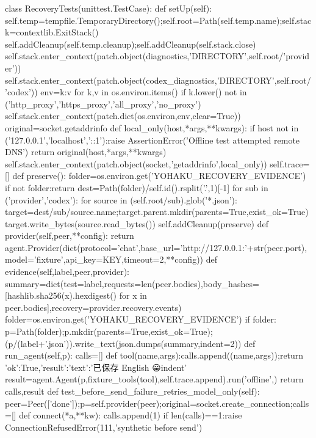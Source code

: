 {class RecoveryTests(unittest.TestCase):
    def setUp(self):
        self.temp=tempfile.TemporaryDirectory();self.root=Path(self.temp.name);self.stack=contextlib.ExitStack()
        self.addCleanup(self.temp.cleanup);self.addCleanup(self.stack.close)
        self.stack.enter_context(patch.object(diagnostics,'DIRECTORY',self.root/'provider'))
        self.stack.enter_context(patch.object(codex_diagnostics,'DIRECTORY',self.root/'codex'))
        env={k:v for k,v in os.environ.items() if k.lower() not in ('http_proxy','https_proxy','all_proxy','no_proxy')}
        self.stack.enter_context(patch.dict(os.environ,env,clear=True))
        original=socket.getaddrinfo
        def local_only(host,*args,**kwargs):
            if host not in ('127.0.0.1','localhost','::1'):raise AssertionError('Offline test attempted remote DNS')
            return original(host,*args,**kwargs)
        self.stack.enter_context(patch.object(socket,'getaddrinfo',local_only))
        self.trace=[]
        def preserve():
            folder=os.environ.get('YOHAKU_RECOVERY_EVIDENCE')
            if not folder:return
            dest=Path(folder)/self.id().rsplit('.',1)[-1]
            for sub in ('provider','codex'):
                for source in (self.root/sub).glob('*.json'):
                    target=dest/sub/source.name;target.parent.mkdir(parents=True,exist_ok=True)
                    target.write_bytes(source.read_bytes())
        self.addCleanup(preserve)
    def provider(self,peer,**config):
        return agent.Provider(dict(protocol='chat',base_url='http://127.0.0.1:'+str(peer.port),model='fixture',api_key=KEY,timeout=2,**config))
    def evidence(self,label,peer,provider):
        summary=dict(test=label,requests=len(peer.bodies),body_hashes=[hashlib.sha256(x).hexdigest() for x in peer.bodies],recovery=provider.recovery.events)
        folder=os.environ.get('YOHAKU_RECOVERY_EVIDENCE')
        if folder:
            p=Path(folder);p.mkdir(parents=True,exist_ok=True);(p/(label+'.json')).write_text(json.dumps(summary,indent=2))
    def run_agent(self,p):
        calls=[]
        def tool(name,args):calls.append((name,args));return {'ok':True,'result':{'text':'已保存 English 😀\n  indent'}}
        result=agent.Agent(p,fixture_tools(tool),self.trace.append).run('offline',{})
        return calls,result
    def test_before_send_failure_retries_model_only(self):
        peer=Peer(['done']);p=self.provider(peer);original=socket.create_connection;calls=[]
        def connect(*a,**kw):
            calls.append(1)
            if len(calls)==1:raise ConnectionRefusedError(111,'synthetic before send')
}
